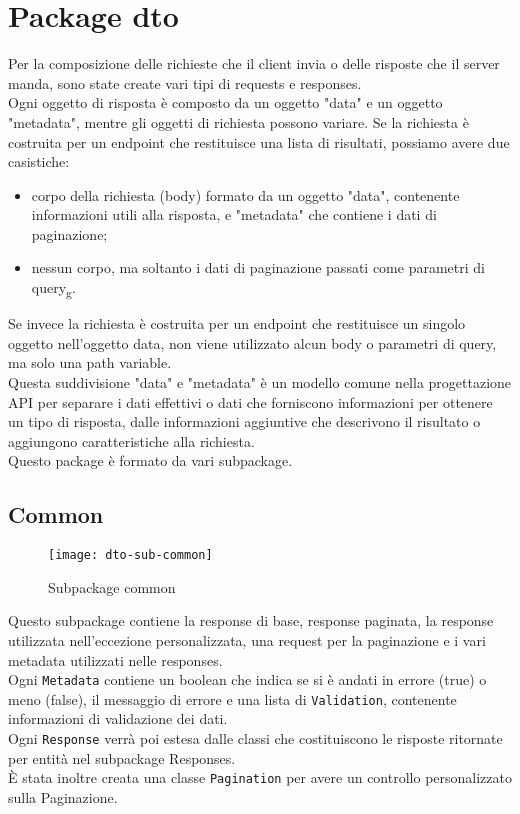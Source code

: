 \section{Package dto}
Per la composizione delle richieste che il client invia o delle risposte che il server manda, sono state create vari tipi di requests e responses.\\
Ogni oggetto di risposta è composto da un oggetto "data" e un oggetto "metadata", mentre gli oggetti di richiesta possono variare. Se la richiesta è costruita per un endpoint che restituisce una lista di risultati, possiamo avere due casistiche:
\begin{itemize}
\item corpo della richiesta (body) formato da un oggetto "data", contenente informazioni utili alla risposta, e "metadata" che contiene i dati di paginazione;
\item nessun corpo, ma soltanto i dati di paginazione passati come parametri di query\textsubscript{g}.
\end{itemize}
Se invece la richiesta è costruita per un endpoint che restituisce un singolo oggetto nell'oggetto data, non viene utilizzato alcun body o parametri di query, ma solo una path variable.\\
Questa suddivisione "data" e "metadata" è un modello comune nella progettazione API per separare i dati effettivi o dati che forniscono informazioni per ottenere un tipo di risposta, dalle informazioni aggiuntive che descrivono il risultato o aggiungono caratteristiche alla richiesta.\\
Questo package è formato da vari subpackage.
\subsection{Common}
\begin{figure}[H] 
    \centering 
    \texttt{[image: dto-sub-common]} 
    \caption{Subpackage common}
\end{figure}
Questo subpackage contiene la response di base, response paginata, la response utilizzata nell'eccezione personalizzata, una request per la paginazione e i vari metadata utilizzati nelle responses.\\ Ogni \texttt{Metadata} contiene un boolean che indica se si è andati in errore (true) o meno (false), il messaggio di errore e una lista di \texttt{Validation}, contenente informazioni di validazione dei dati.\\
Ogni \texttt{Response} verrà poi estesa dalle classi che costituiscono le risposte ritornate per entità nel subpackage Responses.\\
È stata inoltre creata una classe \texttt{Pagination} per avere un controllo personalizzato sulla Paginazione.
